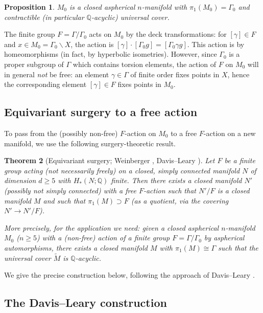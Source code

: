 \documentclass[12pt]{article}
\newtheorem{theorem}{Theorem}[section]
\newtheorem{proposition}[theorem]{Proposition}
\newcommand{\Q}{\mathbb{Q}}
\newcommand{\tilM}{\widetilde{M}}
\begin{document}
\begin{proposition}\label{prop:M0}
$M_0$ is a closed aspherical $n$-manifold with $\pi_1(M_0) = \Gamma_0$ and contractible
(in particular $\Q$-acyclic) universal cover.
\end{proposition}

The finite group $F = \Gamma/\Gamma_0$ acts on $M_0$ by the deck transformations: for
$[\gamma] \in F$ and $x \in M_0 = \Gamma_0 \backslash X$, the action is
$[\gamma] \cdot [\Gamma_0 g] = [\Gamma_0 \gamma g]$.  This action is by homeomorphisms (in
fact, by hyperbolic isometries).  However, since $\Gamma_0$ is a proper subgroup of $\Gamma$
which contains torsion elements, the action of $F$ on $M_0$ will in general \emph{not} be free:
an element $\gamma \in \Gamma$ of finite order fixes points in $X$, hence the corresponding
element $[\gamma] \in F$ fixes points in $M_0$.

\subsection{Equivariant surgery to a free action}

To pass from the (possibly non-free) $F$-action on $M_0$ to a free $F$-action on a new
manifold, we use the following surgery-theoretic result.

\begin{theorem}[Equivariant surgery; Weinberger \cite{Weinberger1994}, Davis--Leary
\cite{DavisLeary2003}]\label{thm:eqsurgery}
Let $F$ be a finite group acting (not necessarily freely) on a closed, simply connected manifold
$N$ of dimension $d \geq 5$ with $H_*(N;\Q)$ finite.  Then there exists a closed manifold $N'$
(possibly not simply connected) with a free $F$-action such that $N'/F$ is a closed manifold
$M$ and such that $\pi_1(M) \supset F$ (as a quotient, via the covering $N' \to N'/F$).

More precisely, for the application we need: given a closed aspherical $n$-manifold $M_0$
($n \geq 5$) with a (non-free) action of a finite group $F = \Gamma/\Gamma_0$ by aspherical
automorphisms, there exists a closed manifold $M$ with $\pi_1(M) \cong \Gamma$ such that the
universal cover $\tilM$ is $\Q$-acyclic.
\end{theorem}

We give the precise construction below, following the approach of Davis--Leary
\cite{DavisLeary2003}.

\subsection{The Davis--Leary construction}
\label{ssec:davisleary}
\end{document}
